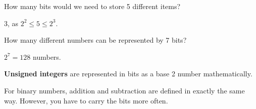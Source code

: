 \begin{eg}
	How many bits would we need to store 5 different items?
\end{eg}
\begin{explanation}
	3, as \( 2^2 \le 5\le 2^3 \).
\end{explanation}

\begin{eg}
	How many different numbers can be represented by 7 bits?
\end{eg}
\begin{explanation}
	\( 2^7=128 \) numbers.
\end{explanation}

\begin{definition}
	\textbf{Unsigned integers} are represented in bits as a base 2 number mathematically.
\end{definition}

For binary numbers, addition and subtraction are defined in exactly the same way. However, you have to carry the bits more often.
